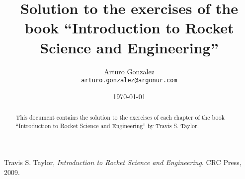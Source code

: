 \documentclass{article}
\begin{document}
\title{Solution to the exercises of the book ``Introduction to Rocket Science and Engineering''}
\author{Arturo Gonzalez\\
	\texttt{arturo.gonzalez@argonur.com}}
\date{\today}
\maketitle

\begin{abstract}
This document contains the solution to the exercises of each chapter of the book ``Introduction to Rocket Science and Engineering'' by Travis S. Taylor.
\end{abstract}



\begin{thebibliography}{99}

	Travis S. Taylor,
	\emph{Introduction to Rocket Science and Engineering}.
	CRC Press,
	2009.
	
\end{thebibliography}
\end{document}
